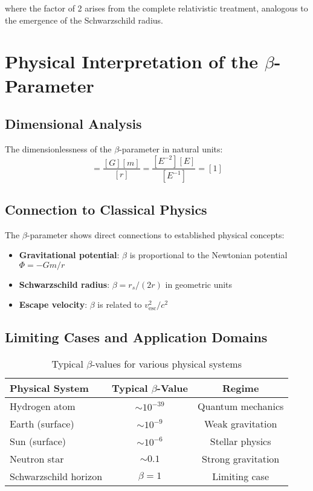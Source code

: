 \documentclass[12pt,a4paper]{article}
\begin{document}
	where the factor of 2 arises from the complete relativistic treatment, analogous to the emergence of the Schwarzschild radius.
	
	\section{Physical Interpretation of the $\beta$-Parameter}
	\label{sec:physical_interpretation}
	
	\subsection{Dimensional Analysis}
	\label{subsec:dimensional_analysis}
	
	The dimensionlessness of the $\beta$-parameter in natural units:
	\begin{equation}
		[\beta] = \frac{[G][m]}{[r]} = \frac{[E^{-2}][E]}{[E^{-1}]} = [1]
	\end{equation}
	
	\subsection{Connection to Classical Physics}
	\label{subsec:classical_connection}
	
	The $\beta$-parameter shows direct connections to established physical concepts:
	
	\begin{itemize}
		\item \textbf{Gravitational potential}: $\beta$ is proportional to the Newtonian potential $\Phi = -Gm/r$
		\item \textbf{Schwarzschild radius}: $\beta = r_s/(2r)$ in geometric units
		\item \textbf{Escape velocity}: $\beta$ is related to $v_{\text{esc}}^2/c^2$
	\end{itemize}
	
	\subsection{Limiting Cases and Application Domains}
	\label{subsec:limiting_cases}
	
	\begin{table}[htbp]
		\centering
		\begin{tabular}{lcc}
			\toprule
			\textbf{Physical System} & \textbf{Typical $\beta$-Value} & \textbf{Regime} \\
			\midrule
			Hydrogen atom & $\sim 10^{-39}$ & Quantum mechanics \\
			Earth (surface) & $\sim 10^{-9}$ & Weak gravitation \\
			Sun (surface) & $\sim 10^{-6}$ & Stellar physics \\
			Neutron star & $\sim 0.1$ & Strong gravitation \\
			Schwarzschild horizon & $\beta = 1$ & Limiting case \\
			\bottomrule
		\end{tabular}
		\caption{Typical $\beta$-values for various physical systems}
		\label{tab:beta_values}
	\end{table}
	
\end{document}
